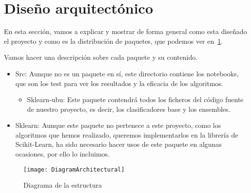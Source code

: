 \section{Diseño arquitectónico}
En esta sección, vamos a explicar y mostrar de forma general como esta diseñado el proyecto y como es la distribución de paquetes, que podemos ver en~\ref{fig:DiagramArchitectural}.

Vamos hacer una descripción sobre cada paquete y su contenido.
\begin{itemize}
	\item Src: Aunque no es un paquete en sí, este directorio contiene los notebooks, que son los test para ver los resultados y la eficacia de los algoritmos.
	\begin{itemize}
		\item Sklearn-ubu: Este paquete contendrá todos los ficheros del código fuente de nuestro proyecto, es decir, los clasificadores base y los ensembles.
	\end{itemize}
	\item Sklearn: Aunque este paquete no pertenece a este proyecto, como los algoritmos que hemos realizado, queremos implementarlos en la librería de Scikit-Learn, ha sido necesario hacer usos de este paquete en algunas ocasiones, por ello lo incluimos.
	
\end{itemize}
\begin{figure}
\centering
\texttt{[image: DiagramArchitectural]}
\caption{Diagrama de la estructura}
\label{fig:DiagramArchitectural}
\end{figure}
